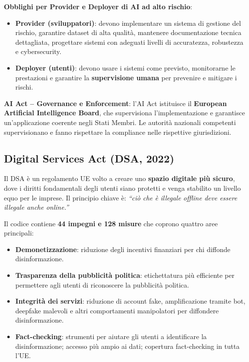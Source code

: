 \documentclass[a4paper,11pt]{article}
\begin{document}
\textbf{Obblighi per Provider e Deployer di AI ad alto rischio}:
\begin{itemize}
  \item \textbf{Provider (sviluppatori)}: devono implementare un sistema di gestione del rischio, garantire dataset di alta qualit\`{a}, mantenere documentazione tecnica dettagliata, progettare sistemi con adeguati livelli di accuratezza, robustezza e cybersecurity.
  \item \textbf{Deployer (utenti)}: devono usare i sistemi come previsto, monitorarne le prestazioni e garantire la \textbf{supervisione umana} per prevenire e mitigare i rischi.
\end{itemize}

\textbf{AI Act -- Governance e Enforcement}: l'AI Act istituisce il \textbf{European Artificial Intelligence Board}, che supervisiona l'implementazione e garantisce un'applicazione coerente negli Stati Membri. Le autorit\`{a} nazionali competenti supervisionano e fanno rispettare la compliance nelle rispettive giurisdizioni.

\subsection{Digital Services Act (DSA, 2022)}

Il DSA \`{e} un regolamento UE volto a creare uno \textbf{spazio digitale pi\`{u} sicuro}, dove i diritti fondamentali degli utenti siano protetti e venga stabilito un livello equo per le imprese. Il principio chiave \`{e}: \emph{``ci\`{o} che \`{e} illegale offline deve essere illegale anche online.''}

Il codice contiene \textbf{44 impegni e 128 misure} che coprono quattro aree principali:
\begin{itemize}
  \item \textbf{Demonetizzazione}: riduzione degli incentivi finanziari per chi diffonde disinformazione.
  \item \textbf{Trasparenza della pubblicit\`{a} politica}: etichettatura pi\`{u} efficiente per permettere agli utenti di riconoscere la pubblicit\`{a} politica.
  \item \textbf{Integrit\`{a} dei servizi}: riduzione di account fake, amplificazione tramite bot, deepfake malevoli e altri comportamenti manipolatori per diffondere disinformazione.
  \item \textbf{Fact-checking}: strumenti per aiutare gli utenti a identificare la disinformazione; accesso pi\`{u} ampio ai dati; copertura fact-checking in tutta l'UE.
\end{itemize}
\end{document}
